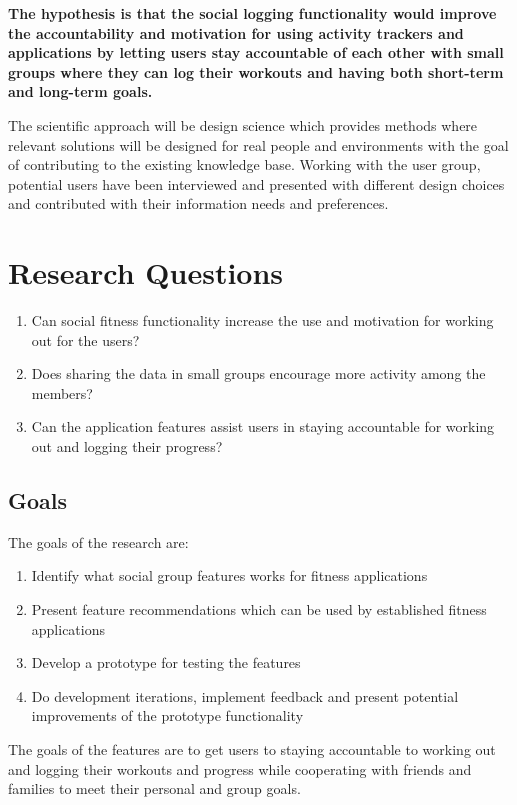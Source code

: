 \textbf{The hypothesis is that the social logging functionality would improve the accountability and motivation for using activity trackers and applications by letting users stay accountable of each other with small groups where they can log their workouts and having both short-term and long-term goals.}

The scientific approach will be design science which provides methods where relevant solutions will be designed for real people and environments with the goal of contributing to the existing knowledge base. Working with the user group, potential users have been interviewed and presented with different design choices and contributed with their information needs and preferences. 


\section{Research Questions}
\begin{enumerate}
    \item Can social fitness functionality increase the use and motivation for working out for the users? 
    \item Does sharing the data in small groups encourage more activity among the members?
    \item Can the application features assist users in staying accountable for working out and logging their progress?
\end{enumerate}
\subsection{Goals}
The goals of the research are:
\begin{enumerate}
\item Identify what social group features works for fitness applications
\item Present feature recommendations which can be used by established fitness applications
\item Develop a prototype for testing the features
\item Do development iterations, implement feedback
 and present potential improvements of the prototype functionality 
\end{enumerate}
The goals of the features are to get users to staying accountable to working out and logging their workouts and progress while cooperating with friends and families to meet their personal and group goals.
 
\newpage
 
